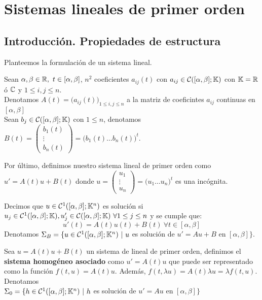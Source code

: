 \chapter{Sistemas lineales de primer orden}
\section{Introducción. Propiedades de estructura}
\begin{defi} Planteemos la formulación de un sistema lineal.

Sean $\alpha,\beta\in\R,\ t\in[\alpha,\beta]$, $n^2$ coeficientes $a_{ij}(t)$ con $a_{ij}\in\mathcal{C}([\alpha,\beta];\mathbb{K})$ con $\mathbb{K}=\mathbb{R}$ ó $\mathbb{C}$ y $1\leq i,j\leq n$.\\
Denotamos $A(t)=\big(a_{ij}(t)\big)_{1\leq i,j\leq n}$ a la matriz de coeficintes $a_{ij}$ continuas en $[\alpha,\beta]$\\
Sean $b_j\in \mathcal{C}([\alpha,\beta];\mathbb{K})$ con $1\leq n$, denotamos $B(t)=\begin{pmatrix}b_1(t)\\\vdots\\b_n(t)
\end{pmatrix}=\big( b_1(t)\hdots b_n(t)\big)^t$.

Por último, definimos nuestro sistema lineal de primer orden como $u'=A(t)u+B(t)$ donde $u=\begin{pmatrix}u_1\\\vdots\\u_n\end{pmatrix}=\big( u_1\hdots u_n\big)^t$ es una incógnita.
\end{defi}

\begin{defi} Decimos que $u\in\mathcal{C}^1([\alpha,\beta];\mathbb{K}^n)$ es solución si $u_j\in\mathcal{C}^1([\alpha,\beta];\mathbb{K}),\\
u_j'\in\mathcal{C}([\alpha,\beta];\mathbb{K})\ \forall 1\leq j\leq n$ y se cumple que:
\[u'(t)=A(t)u(t)+B(t)\ \forall t\in[\alpha,\beta]\]
Denotamos $\Sigma_B=\{u\in\Cgot^1([\alpha,\beta];\K^n)\ |\ u$ es solución de $u'=Au+B$ en $[\alpha,\beta]\}$.
\end{defi}

\begin{defi} Sea $u=A(t)u+B(t)$ un sistema de lineal de primer orden, definimos el \textbf{sistema homogéneo asociado} como $u'=A(t)u$ que puede ser representado como la función $f(t,u)=A(t)u$. Además, $f(t,\lambda u)=A(t)\lambda u=\lambda f(t,u)$. Denotamos\\
$\Sigma_0=\{h\in\Cgot^1([\alpha,\beta];\K^n)\ |\ h$ es solución de $u'=Au$ en $[\alpha,\beta]\}$
\end{defi}

